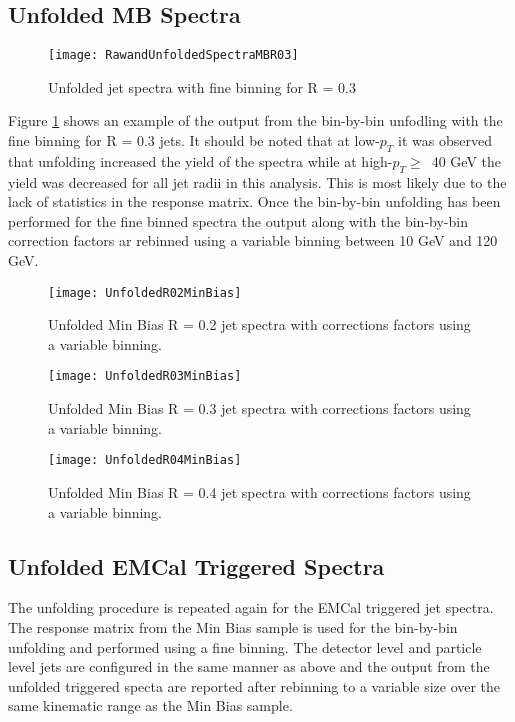 \subsection{Unfolded MB Spectra}

\begin{figure}[h]
\texttt{[image: RawandUnfoldedSpectraMBR03]}
\centering
\caption{Unfolded jet spectra with fine binning for R = 0.3}
\label{fig:Unfoldfine}
\end{figure}

Figure \ref{fig:Unfoldfine} shows an example of the output from the bin-by-bin unfodling with the fine binning for R = 0.3 jets.  It should be noted that at low-$p_{T}$ it was observed that unfolding increased the yield of the spectra while at high-$p_{T} \geq \,$ 40 GeV the yield was decreased for all jet radii in this analysis.  This is most likely due to the lack of statistics in the response matrix.  Once the bin-by-bin unfolding has been performed for the fine binned spectra the output along with the bin-by-bin correction factors ar rebinned using a variable binning between 10 GeV and 120 GeV.

\begin{figure}[h]
\texttt{[image: UnfoldedR02MinBias]}
\centering
\caption{Unfolded Min Bias R = 0.2 jet spectra with corrections factors using a variable binning.}
\label{fig:UnfoldvarR02}
\end{figure}

\begin{figure}[h]
\texttt{[image: UnfoldedR03MinBias]}
\centering
\caption{Unfolded Min Bias R = 0.3 jet spectra with corrections factors using a variable binning.}
\label{fig:UnfoldvarR03}
\end{figure}

\begin{figure}[h]
\texttt{[image: UnfoldedR04MinBias]}
\centering
\caption{Unfolded Min Bias R = 0.4 jet spectra with corrections factors using a variable binning.}
\label{fig:UnfoldvarR04}
\end{figure}


\subsection{Unfolded EMCal Triggered Spectra}
The unfolding procedure is repeated again for the EMCal triggered jet spectra.  The response matrix from the Min Bias sample is used for the bin-by-bin unfolding and performed using a fine binning.  The detector level and particle level jets are configured in the same manner as above and the output from the unfolded triggered specta are reported after rebinning to a variable size over the same kinematic range as the Min Bias sample.

